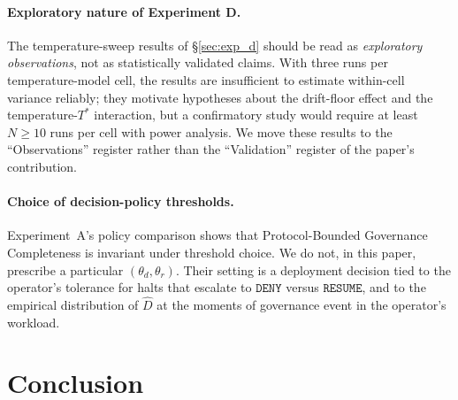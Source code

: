 \documentclass[11pt]{article}
\newcommand{\Dhat}{\widehat{D}}
\newcommand{\RESUME}{\texttt{RESUME}}
\newcommand{\DENY}{\texttt{DENY}}
\newcommand{\Tstar}{T^*}
\begin{document}
\paragraph{Exploratory nature of Experiment D.}
The temperature-sweep results of \S\ref{sec:exp_d} should be read
as \emph{exploratory observations}, not as statistically validated
claims. With three runs per temperature-model cell, the results
are insufficient to estimate within-cell variance reliably; they
motivate hypotheses about the drift-floor effect and the
temperature-$\Tstar$ interaction, but a confirmatory study would
require at least $N \geq 10$ runs per cell with power analysis.
We move these results to the ``Observations'' register rather
than the ``Validation'' register of the paper's contribution.

\paragraph{Choice of decision-policy thresholds.}
Experiment~A's policy comparison shows that Protocol-Bounded
Governance Completeness is invariant under threshold choice. We
do not, in this paper, prescribe a particular $(\theta_d, \theta_r)$.
Their setting is a deployment decision tied to the operator's
tolerance for halts that escalate to $\DENY$ versus $\RESUME$, and
to the empirical distribution of $\Dhat$ at the moments of
governance event in the operator's workload.

\section{Conclusion}
\label{sec:conclusion}
\end{document}
